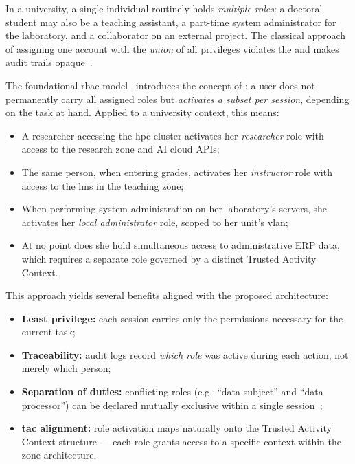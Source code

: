 In a university, a single individual routinely holds \emph{multiple
roles}: a doctoral student may also be a teaching assistant, a part-time
system administrator for the laboratory, and a collaborator on an
external project. The classical approach of assigning one account with
the \emph{union} of all privileges violates the
 and makes audit trails
opaque~\cite{sandhu1996}.

The foundational \gls{rbac} model~\cite{sandhu1996} introduces the concept of
: a user does not permanently
carry all assigned roles but \emph{activates a subset per session},
depending on the task at hand. Applied to a university context, this
means:

\begin{itemize}[nosep]
    \item A researcher accessing the \gls{hpc} cluster activates her
    \emph{researcher} role with access to the research zone and AI
    cloud APIs;
    \item The same person, when entering grades, activates her
    \emph{instructor} role with access to the \gls{lms} in the teaching zone;
    \item When performing system administration on her laboratory's
    servers, she activates her \emph{local administrator} role, scoped
    to her unit's \gls{vlan};
    \item At no point does she hold simultaneous access to
    administrative ERP data, which requires a separate role governed by
    a distinct Trusted Activity Context.
\end{itemize}

\noindent
This approach yields several benefits aligned with the proposed
architecture:

\begin{itemize}[nosep]
    \item \textbf{Least privilege:} each session carries only the
    permissions necessary for the current task;
    \item \textbf{Traceability:} audit logs record \emph{which role}
    was active during each action, not merely which person;
    \item \textbf{Separation of duties:} conflicting roles (e.g.\
    ``data subject'' and ``data processor'') can be declared mutually
    exclusive within a single session~\cite{sandhu1996};
    \item \textbf{\gls{tac} alignment:} role activation maps naturally onto the
    Trusted Activity Context structure --- each role grants access to a
    specific context within the zone architecture.
\end{itemize}

